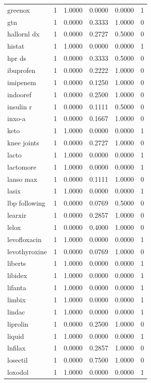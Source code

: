\begin{longtable}{p{3.0cm}rrrrr}
greenox & 1 & 1.0000 & 0.0000 & 0.0000 & 1 \\
gtn & 1 & 0.0000 & 0.3333 & 1.0000 & 0 \\
hallornl dx & 1 & 0.0000 & 0.2727 & 0.5000 & 0 \\
histat & 1 & 1.0000 & 0.0000 & 0.0000 & 1 \\
hpr ds & 1 & 0.0000 & 0.3333 & 0.5000 & 0 \\
ibuprofen & 1 & 0.0000 & 0.2222 & 1.0000 & 0 \\
imipenem & 1 & 0.0000 & 0.1250 & 1.0000 & 0 \\
indooref & 1 & 0.0000 & 0.2500 & 1.0000 & 0 \\
insulin r & 1 & 0.0000 & 0.1111 & 0.5000 & 0 \\
inxo-a & 1 & 0.0000 & 0.1667 & 1.0000 & 0 \\
keto & 1 & 1.0000 & 0.0000 & 0.0000 & 1 \\
knee joints & 1 & 0.0000 & 0.2727 & 1.0000 & 0 \\
lacto & 1 & 1.0000 & 0.0000 & 0.0000 & 1 \\
lactomore & 1 & 1.0000 & 0.0000 & 0.0000 & 1 \\
lanso max & 1 & 0.0000 & 0.1111 & 1.0000 & 0 \\
lasix & 1 & 1.0000 & 0.0000 & 0.0000 & 1 \\
lbp following & 1 & 0.0000 & 0.0769 & 0.5000 & 0 \\
learxir & 1 & 0.0000 & 0.2857 & 1.0000 & 0 \\
lelox & 1 & 0.0000 & 0.4000 & 1.0000 & 0 \\
levofloxacin & 1 & 1.0000 & 0.0000 & 0.0000 & 1 \\
levothyroxine & 1 & 0.0000 & 0.0769 & 1.0000 & 0 \\
liberts & 1 & 1.0000 & 0.0000 & 0.0000 & 1 \\
libidex & 1 & 1.0000 & 0.0000 & 0.0000 & 1 \\
lifanta & 1 & 1.0000 & 0.0000 & 0.0000 & 1 \\
limbix & 1 & 1.0000 & 0.0000 & 0.0000 & 1 \\
lindac & 1 & 1.0000 & 0.0000 & 0.0000 & 1 \\
liprolin & 1 & 0.0000 & 0.2500 & 1.0000 & 0 \\
liquid & 1 & 1.0000 & 0.0000 & 0.0000 & 1 \\
lnfilax & 1 & 0.0000 & 0.2857 & 1.0000 & 0 \\
losectil & 1 & 0.0000 & 0.7500 & 1.0000 & 0 \\
loxodol & 1 & 1.0000 & 0.0000 & 0.0000 & 1 \\

\end{longtable}
